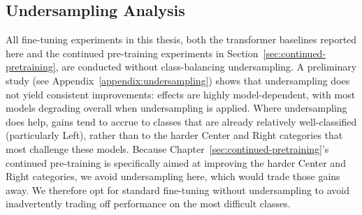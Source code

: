 \subsection{Undersampling Analysis}

All fine-tuning experiments in this thesis, both the transformer baselines reported here and the continued pre-training experiments in Section~\ref{sec:continued-pretraining}, are conducted without class-balancing undersampling. A preliminary study (see Appendix~\ref{appendix:undersampling}) shows that undersampling does not yield consistent improvements: effects are highly model-dependent, with most models degrading overall when undersampling is applied. Where undersampling does help, gains tend to accrue to classes that are already relatively well-classified (particularly Left), rather than to the harder Center and Right categories that most challenge these models. Because Chapter~\ref{sec:continued-pretraining}'s continued pre-training is specifically aimed at improving the harder Center and Right categories, we avoid undersampling here, which would trade those gains away. We therefore opt for standard fine-tuning without undersampling to avoid inadvertently trading off performance on the most difficult classes.
